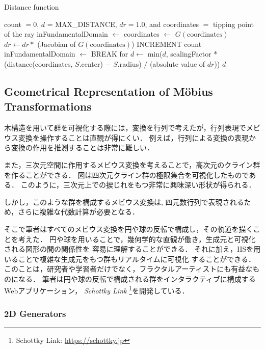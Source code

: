 \begin{algorithm}
 \caption{Distance function}
 \label{iis3d}
 \begin{algorithmic}
  \REQUIRE count $= 0$, $d$ = MAX\_DISTANCE, $dr = 1.0$, and coordinates $=$ tipping
  point of the ray
  \STATE inFundamentalDomain $\leftarrow$ \TRUE
  \STATE coordinates $\leftarrow$ $G(\text{coordinates})$
  \STATE $dr \leftarrow dr * $ (Jacobian of $G(\text{coordinates})$)
  \STATE INCREMENT count
  \STATE inFundamentalDomain $\leftarrow$ \FALSE
  \ENDIF
  \ENDFOR
  \STATE BREAK for
  \ENDIF
  \ENDFOR
  \STATE $d \leftarrow$ min($d$, scalingFactor * (distance(coordinates, $S$.center) $-$
  $S$.radius) $/$ (absolute value of $dr$))
  \ENDFOR
  \RETURN $d$
 \end{algorithmic}
\end{algorithm}

\subsection{Geometrical Representation of M\"obius Transformations}

木構造を用いて群を可視化する際には，変換を行列で考えたが，行列表現でメビ
ウス変換を操作することは直観が得にくい．
例えば，行列による変換の表現から変換の作用を推測することは非常に難しい．

また，三次元空間に作用するメビウス変換を考えることで，高次元のクライン群を作ることができる．
図は四次元クライン群の極限集合を可視化したものである．
このように，三次元上での捩じれをもつ非常に興味深い形状が得られる．

しかし，このような群を構成するメビウス変換は,
四元数行列で表現されるため，さらに複雑な代数計算が必要となる．

そこで筆者はすべてのメビウス変換を円や球の反転で構成し，その軌道を描くことを考えた．
円や球を用いることで，幾何学的な直観が働き，生成元と可視化される図形の間の関係性を
容易に理解することができる．
それに加え，IISを用いることで複雑な生成元をもつ群もリアルタイムに可視化
することができる．
このことは，研究者や学習者だけでなく，フラクタルアーティストにも有益なも
のになる．
筆者は円や球の反転で構成される群をインタラクティブに構成するWebアプリケーション，
{\it Schottky Link} \footnote{Schottky Link:
\url{https://schottky.jp}}を開発している．

\subsubsection{2D Generators}

